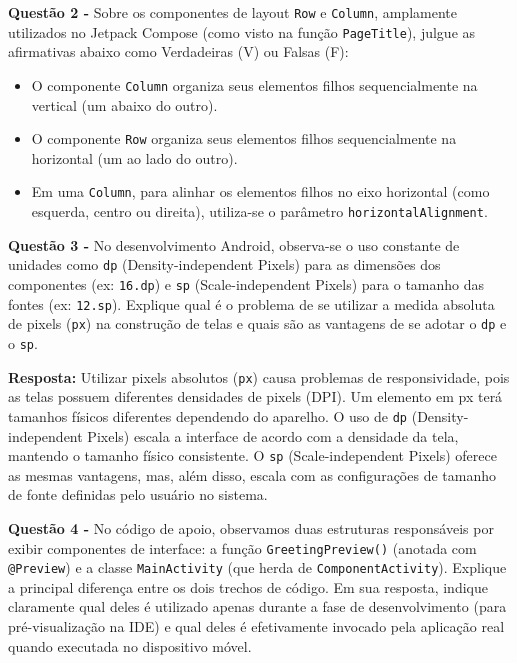 \documentclass[12pt,a4paper]{article}
\begin{document}
\vspace{0.5cm}

\textbf{Questão 2 - } Sobre os componentes de layout \texttt{Row} e \texttt{Column}, amplamente utilizados no Jetpack Compose (como visto na função \texttt{PageTitle}), julgue as afirmativas abaixo como Verdadeiras (V) ou Falsas (F):

\begin{itemize}[label={(\ \ \ )}]
    \item[( V )] O componente \texttt{Column} organiza seus elementos filhos sequencialmente na vertical (um abaixo do outro).
    \item[( V )] O componente \texttt{Row} organiza seus elementos filhos sequencialmente na horizontal (um ao lado do outro).
    \item[( V )] Em uma \texttt{Column}, para alinhar os elementos filhos no eixo horizontal (como esquerda, centro ou direita), utiliza-se o parâmetro \texttt{horizontalAlignment}.
\end{itemize}

\vspace{0.5cm}

\textbf{Questão 3 - } No desenvolvimento Android, observa-se o uso constante de unidades como \texttt{dp} (Density-independent Pixels) para as dimensões dos componentes (ex: \texttt{16.dp}) e \texttt{sp} (Scale-independent Pixels) para o tamanho das fontes (ex: \texttt{12.sp}). Explique qual é o problema de se utilizar a medida absoluta de pixels (\texttt{px}) na construção de telas e quais são as vantagens de se adotar o \texttt{dp} e o \texttt{sp}.

\vspace{0.3cm}
\textbf{Resposta:} Utilizar pixels absolutos (\texttt{px}) causa problemas de responsividade, pois as telas possuem diferentes densidades de pixels (DPI). Um elemento em px terá tamanhos físicos diferentes dependendo do aparelho. O uso de \texttt{dp} (Density-independent Pixels) escala a interface de acordo com a densidade da tela, mantendo o tamanho físico consistente. O \texttt{sp} (Scale-independent Pixels) oferece as mesmas vantagens, mas, além disso, escala com as configurações de tamanho de fonte definidas pelo usuário no sistema.

\vspace{0.5cm}

\textbf{Questão 4 - } No código de apoio, observamos duas estruturas responsáveis por exibir componentes de interface: a função \texttt{GreetingPreview()} (anotada com \texttt{@Preview}) e a classe \texttt{MainActivity} (que herda de \texttt{ComponentActivity}). Explique a principal diferença entre os dois trechos de código. Em sua resposta, indique claramente qual deles é utilizado apenas durante a fase de desenvolvimento (para pré-visualização na IDE) e qual deles é efetivamente invocado pela aplicação real quando executada no dispositivo móvel.
\end{document}
